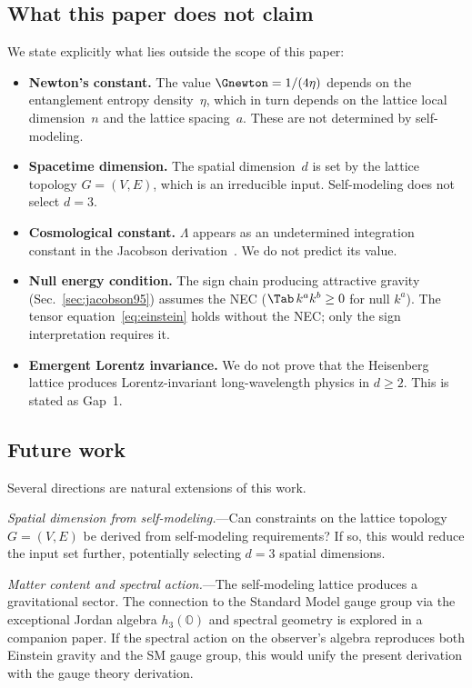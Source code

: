 \subsection{What this paper does not claim}
\label{sec:not-claimed}

We state explicitly what lies outside the scope of this paper:
\begin{itemize}
\item \textbf{Newton's constant.}  The value $\Gnewton = 1/(4\eta)$
  depends on the entanglement entropy density~$\eta$, which in turn
  depends on the lattice local dimension~$n$ and the lattice spacing~$a$.
  These are not determined by self-modeling.
\item \textbf{Spacetime dimension.}  The spatial dimension~$d$ is set by
  the lattice topology $G = (V, E)$, which is an irreducible input.
  Self-modeling does not select $d = 3$.
\item \textbf{Cosmological constant.}  $\Lambda$ appears as an
  undetermined integration constant in the Jacobson
  derivation~\cite{Jacobson1995, JacobsonSperanza2019}.  We do not
  predict its value.
\item \textbf{Null energy condition.}  The sign chain producing
  attractive gravity (Sec.~\ref{sec:jacobson95}) assumes the NEC
  ($\Tab\, k^a k^b \geq 0$ for null $k^a$).  The tensor
  equation~\eqref{eq:einstein} holds without the NEC; only the sign
  interpretation requires it.
\item \textbf{Emergent Lorentz invariance.}  We do not prove that
  the Heisenberg lattice produces Lorentz-invariant long-wavelength
  physics in $d \geq 2$.  This is stated as Gap~1.
\end{itemize}

\subsection{Future work}
\label{sec:future}

Several directions are natural extensions of this work.

\emph{Spatial dimension from self-modeling.}---Can constraints on the
lattice topology $G = (V, E)$ be derived from self-modeling requirements?
If so, this would reduce the input set further, potentially selecting
$d = 3$ spatial dimensions.

\emph{Matter content and spectral action.}---The self-modeling lattice
produces a gravitational sector.  The connection to the Standard Model
gauge group via the exceptional Jordan algebra $h_3(\mathbb{O})$ and
spectral geometry is explored in a companion paper.  If the spectral
action on the observer's algebra reproduces both Einstein gravity and the
SM gauge group, this would unify the present derivation with the gauge
theory derivation.

